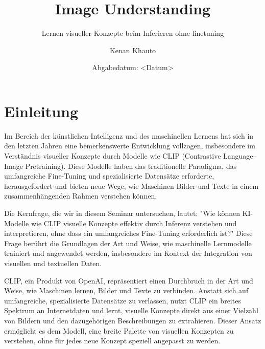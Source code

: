 \documentclass[nolibertine, ngerman]{ttlab-qualify}
\begin{document}
\titlehead{
  Kenan Khauto\\
  7592047\\
  B.Sc Informatik\\
  Studienfachkombination / Schwerpunkt \\
  6\\
  kenan.khauto@stud.uni-frankfurt.de 
}
\subject{Seminararbeit Text Analytics}
\author{Kenan Khauto}
\title{Image Understanding}
\subtitle{Lernen visueller Konzepte beim Inferieren ohne finetuning}
\date{Abgabedatum: <Datum>}
\publishers{Goethe-Universität Frankfurt am Main\\Prof. Alexander Mehler}

\maketitle


\tableofcontents

\chapter{Einleitung}
Im Bereich der künstlichen Intelligenz und des maschinellen Lernens hat sich in den letzten Jahren eine bemerkenswerte Entwicklung 
vollzogen, insbesondere im Verständnis visueller Konzepte durch Modelle wie CLIP (Contrastive Language–Image Pretraining). 
Diese Modelle haben das traditionelle Paradigma, das umfangreiche Fine-Tuning und spezialisierte Datensätze erforderte, herausgefordert 
und bieten neue Wege, wie Maschinen Bilder und Texte in einem zusammenhängenden Rahmen verstehen können.


Die Kernfrage, die wir in diesem Seminar untersuchen, lautet: "Wie können KI-Modelle wie CLIP visuelle Konzepte effektiv durch 
Inferenz verstehen und interpretieren, ohne dass ein umfangreiches Fine-Tuning erforderlich ist?" Diese Frage berührt die Grundlagen 
der Art und Weise, wie maschinelle Lernmodelle trainiert und angewendet werden, insbesondere im Kontext der Integration von visuellen und 
textuellen Daten.


CLIP, ein Produkt von OpenAI, repräsentiert einen Durchbruch in der Art und Weise, wie Maschinen lernen, Bilder und Texte zu verbinden. 
Anstatt sich auf umfangreiche, spezialisierte Datensätze zu verlassen, nutzt CLIP ein breites Spektrum an Internetdaten und lernt, 
visuelle Konzepte direkt aus einer Vielzahl von Bildern und den dazugehörigen Beschreibungen zu extrahieren. Dieser Ansatz ermöglicht 
es dem Modell, eine breite Palette von visuellen Konzepten zu verstehen, ohne für jedes neue Konzept speziell angepasst zu werden.
\end{document}
